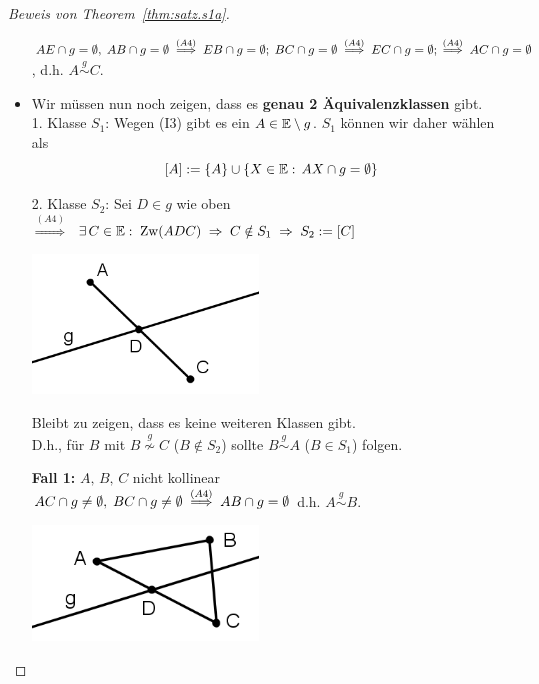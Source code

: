 \begin{proof}[Beweis von Theorem~\ref{thm:satz.s1a}]
\begin{itemize}
${AE}\cap g=\emptyset,\;{AB}\cap g=\emptyset\;
\stackrel{(A4)}{\Longrightarrow}\;{EB}\cap g=\emptyset;\;
{BC}\cap g=\emptyset\; \stackrel{(A4)}{\Longrightarrow}\;
{EC}\cap g=\emptyset;\;\stackrel{(A4)}{\Longrightarrow}\;
{AC}\cap g=\emptyset$, d.h. $A\stackrel{g}{\sim} C$.

\bigskip


\item
Wir m\"{u}ssen nun noch zeigen, dass es {\bf genau 2 \"{A}quivalenzklassen} gibt.\\

1. Klasse $S_1$: Wegen (I3) gibt es ein $A\in\mathbb E\setminus g$. 
 $S_1$ können wir daher wählen als
\[[A]:=\{A\}\cup\{X\in\mathbb E:\,{AX}\cap g=\emptyset\}\]

2. Klasse $S_2$: Sei $D\in g$ wie oben\\
$\stackrel{(A4)}{\Longrightarrow}$
 $\exists\,C\in\mathbb E:\;\operatorname{Zw}(ADC)\;\Rightarrow\;C\notin
S_1\;\Rightarrow\;S_2:=[C]$


\centerline{\includegraphics[width=6cm]{BILDER/1-1-06d-Seiten.png}}


\noindent
Bleibt zu zeigen, dass es keine weiteren Klassen gibt.\\
D.h., für $B$ mit $B\stackrel{g}{\nsim} C$ ($B\notin S_2$) sollte
$B\stackrel{g}{\sim} A$ ($B \in S_1$) folgen.



    {\bf Fall 1:} $A,\,B,\,C$ nicht kollinear\\
${AC}\cap g\neq\emptyset,\;{BC}\cap g\neq\emptyset\;
\stackrel{(A4)}{\Longrightarrow}\;{AB}\cap g=\emptyset$ d.h.
$A\stackrel{g}{\sim} B$.

\centerline{\includegraphics[width=6cm]{BILDER/1-1-06e-Seiten.png}}



\end{itemize}
\end{proof}
